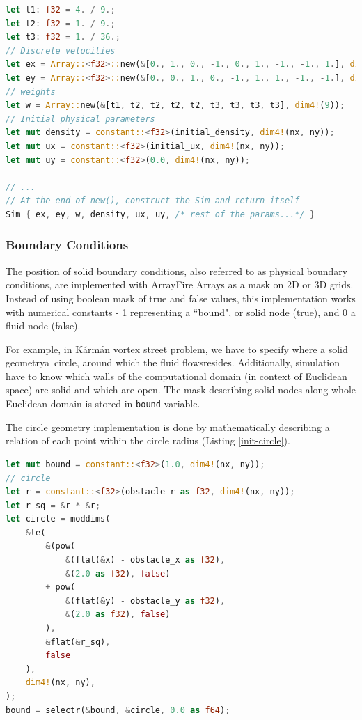 \begin{lstlisting}[language=Rust, caption=Setting initial parameters that are independent from constructor method's input arguments., label=independent-initial-params]
let t1: f32 = 4. / 9.;
let t2: f32 = 1. / 9.;
let t3: f32 = 1. / 36.;
// Discrete velocities
let ex = Array::<f32>::new(&[0., 1., 0., -1., 0., 1., -1., -1., 1.], dim4!(9));
let ey = Array::<f32>::new(&[0., 0., 1., 0., -1., 1., 1., -1., -1.], dim4!(9));
// weights
let w = Array::new(&[t1, t2, t2, t2, t2, t3, t3, t3, t3], dim4!(9));
// Initial physical parameters
let mut density = constant::<f32>(initial_density, dim4!(nx, ny));
let mut ux = constant::<f32>(initial_ux, dim4!(nx, ny));
let mut uy = constant::<f32>(0.0, dim4!(nx, ny));

// ...
// At the end of new(), construct the Sim and return itself
Sim { ex, ey, w, density, ux, uy, /* rest of the params...*/ }
\end{lstlisting}

\subsubsection{Boundary Conditions}
The position of solid boundary conditions, also referred to as physical boundary conditions, are implemented with ArrayFire Arrays as a mask on 2D or 3D grids. Instead of using boolean mask of true and false values, this implementation works with  numerical constants - 1 representing a ``bound", or solid node (true), and 0 a fluid node (false).

For example, in Kármán vortex street problem, we have to specify where a solid geometry\textemdash a~circle, around which the fluid flows\textemdash resides. Additionally, simulation have to know which walls of the computational domain (in context of Euclidean space) are solid and which are open. The mask describing solid nodes along whole Euclidean domain is stored in \texttt{bound} variable.

The circle geometry implementation is done by mathematically describing a relation of each point within the circle radius (Listing \ref{init-circle}).

\begin{lstlisting}[language=Rust, caption=Setting the boundary conditions of a solid circle geometry in 2D Karmán vortex street., label=init-circle]
let mut bound = constant::<f32>(1.0, dim4!(nx, ny));
// circle
let r = constant::<f32>(obstacle_r as f32, dim4!(nx, ny));
let r_sq = &r * &r;
let circle = moddims(
	&le(
		&(pow(
			&(flat(&x) - obstacle_x as f32),
			&(2.0 as f32), false)
		+ pow(
			&(flat(&y) - obstacle_y as f32),
			&(2.0 as f32), false)
		),
		&flat(&r_sq),
		false
	),
	dim4!(nx, ny),
);
bound = selectr(&bound, &circle, 0.0 as f64);
\end{lstlisting}

